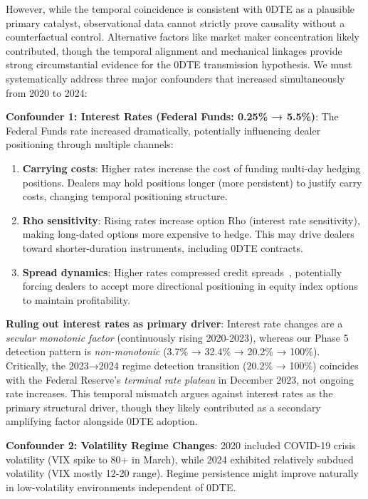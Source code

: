 However, while the temporal coincidence is consistent with 0DTE as a plausible primary catalyst, observational data cannot strictly prove causality without a counterfactual control. Alternative factors like market maker concentration likely contributed, though the temporal alignment and mechanical linkages provide strong circumstantial evidence for the 0DTE transmission hypothesis. We must systematically address three major confounders that increased simultaneously from 2020 to 2024:

\vspace{0.2cm}

\noindent\textbf{Confounder 1: Interest Rates (Federal Funds: 0.25\% → 5.5\%)}: The Federal Funds rate increased dramatically, potentially influencing dealer positioning through multiple channels:

\begin{enumerate}
\item \textbf{Carrying costs}: Higher rates increase the cost of funding multi-day hedging positions. Dealers may hold positions longer (more persistent) to justify carry costs, changing temporal positioning structure.
\item \textbf{Rho sensitivity}: Rising rates increase option Rho (interest rate sensitivity), making long-dated options more expensive to hedge. This may drive dealers toward shorter-duration instruments, including 0DTE contracts.
\item \textbf{Spread dynamics}: Higher rates compressed credit spreads~\cite{kolanovic2023volmageddon}, potentially forcing dealers to accept more directional positioning in equity index options to maintain profitability.
\end{enumerate}

\noindent\textbf{Ruling out interest rates as primary driver}: Interest rate changes are a \textit{secular monotonic factor} (continuously rising 2020-2023), whereas our Phase 5 detection pattern is \textit{non-monotonic} (3.7\% → 32.4\% → 20.2\% → 100\%). Critically, the 2023→2024 regime detection transition (20.2\% → 100\%) coincides with the Federal Reserve's \textit{terminal rate plateau} in December 2023, not ongoing rate increases. This temporal mismatch argues against interest rates as the primary structural driver, though they likely contributed as a secondary amplifying factor alongside 0DTE adoption.

\vspace{0.2cm}

\noindent\textbf{Confounder 2: Volatility Regime Changes}: 2020 included COVID-19 crisis volatility (VIX spike to 80+ in March), while 2024 exhibited relatively subdued volatility (VIX mostly 12-20 range). Regime persistence might improve naturally in low-volatility environments independent of 0DTE.

